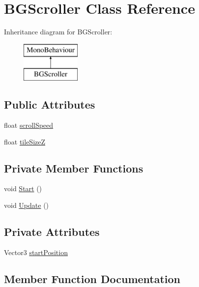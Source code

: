 \hypertarget{class_b_g_scroller}{}\section{B\+G\+Scroller Class Reference}
\label{class_b_g_scroller}
Inheritance diagram for B\+G\+Scroller\+:\begin{figure}[H]
\begin{center}
\leavevmode
\includegraphics[height=2.000000cm]{class_b_g_scroller}
\end{center}
\end{figure}
\subsection*{Public Attributes}
\begin{DoxyCompactItemize}
\item 
float \mbox{\hyperlink{class_b_g_scroller_a31ae764c810451258f69c9e15def429f}{scroll\+Speed}}
\item 
float \mbox{\hyperlink{class_b_g_scroller_aa59f8685bd548c55d50c8396ae28ff2f}{tile\+SizeZ}}
\end{DoxyCompactItemize}
\subsection*{Private Member Functions}
\begin{DoxyCompactItemize}
\item 
void \mbox{\hyperlink{class_b_g_scroller_a7828067d39d4fe21cf4587dac494b59d}{Start}} ()
\item 
void \mbox{\hyperlink{class_b_g_scroller_a317fd0b2bb09e0ff6c281bd1be64c751}{Update}} ()
\end{DoxyCompactItemize}
\subsection*{Private Attributes}
\begin{DoxyCompactItemize}
\item 
Vector3 \mbox{\hyperlink{class_b_g_scroller_aeeaa39460879994b538440af714336d3}{start\+Position}}
\end{DoxyCompactItemize}


\subsection{Member Function Documentation}
\mbox{\label{class_b_g_scroller_a7828067d39d4fe21cf4587dac494b59d}} 
